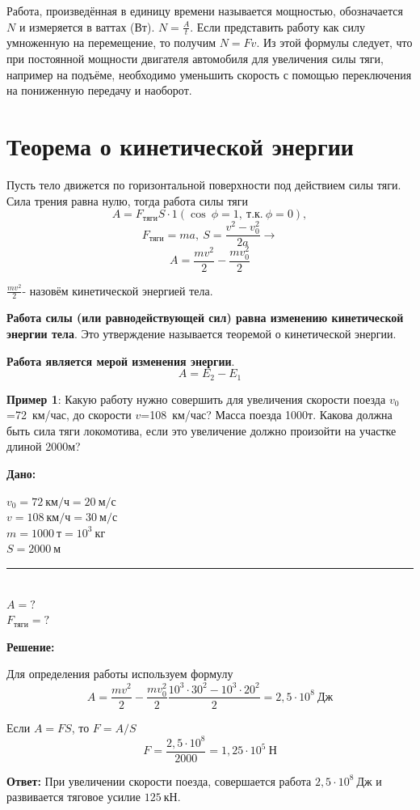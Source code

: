 \documentclass[a5paper, 10pt]{diss_4}
\renewcommand{\'}{\,'}
\begin{document}
  Работа, произведённая в единицу времени называется мощностью, обозначается
$N$ и измеряется в ваттах (Вт). $N=\frac{A}{t}$. Если представить работу как
силу умноженную на перемещение, то получим $N=Fv$. Из этой формулы следует,
что при постоянной мощности двигателя автомобиля для увеличения силы тяги,
например на подъёме, необходимо уменьшить скорость с помощью переключения на
пониженную передачу и наоборот.


\section{Теорема о кинетической энергии}

  Пусть тело движется по горизонтальной поверхности под действием силы
тяги. Сила трения равна нулю, тогда работа силы тяги
\[
A=F_{тяги}S\cdot1(\cos\ \phi=1,\ т.к.\ \phi=0),
\]
\[
F_{тяги}=ma,\ S=\frac{v^2-v^2_0}{2a}\to
\]
\[
A=\frac{mv^2}{2}-\frac{mv^2_0}{2}
\]

 $\frac{mv^2}{2}$- назовём кинетической энергией тела.

  \textbf{Работа силы (или равнодействующей сил) равна изменению кинетической
энергии тела}. Это утверждение называется теоремой о кинетической энергии.

 \textbf{Работа является мерой изменения энергии}.
\[
A=E_2-E_1
\]

  \textbf{Пример 1}: Какую работу нужно совершить для увеличения скорости
поезда $v_0$=72\ км/час, до скорости $v$=108\ км/час? Масса поезда 1000т. Какова
должна быть сила тяги локомотива, если это увеличение должно произойти на
участке длиной 2000м?

\hspace{1cm}\textbf{Дано:}\hspace{.3cm}
\parbox[t]{4,3cm}{
$v_0=72\ км/ч=20\ м/с$\\
$v=108\ км/ч=30\ м/с$\\
$m=1000\ т=10^3\ кг$\\
$S=2000\ м$\\
\rule{4cm}{.4pt}\\
$A=?$\\
$F_{тяги}=?$
}

 \textbf{Решение:}

Для определения работы используем формулу
\[
A=\frac{mv^2}{2}-\frac{mv^2_0}{2}\frac{10^3\cdot30^2-10^3\cdot20^2}{2}=
2,5\cdot10^8\ Дж
\]

Если $A=FS$, то $F=A/S$
\[
F=\frac{2,5\cdot10^8}{2000}=1,25\cdot10^5\ Н
\]

  \textbf{Ответ:} При увеличении скорости поезда, совершается работа
$2,5\cdot10^8\ Дж$ и развивается тяговое усилие $125\ кН$.
\end{document}
